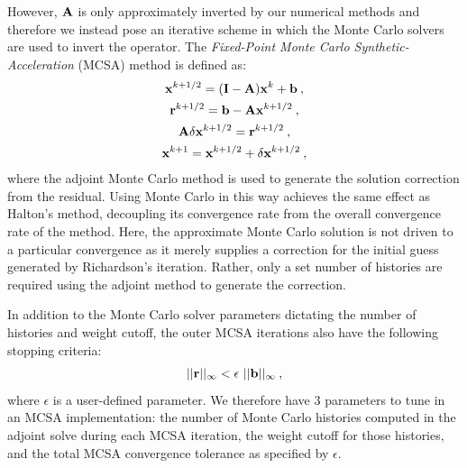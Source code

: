 However, $\mathbf{A}$ is only approximately inverted by our numerical
methods and therefore we instead pose an iterative scheme in which the
Monte Carlo solvers are used to invert the operator. The
\textit{Fixed-Point Monte Carlo Synthetic-Acceleration} (MCSA) method
is defined as:
\begin{subequations}
  \begin{gather}
    \mathbf{x}^{k+1/2} = (\mathbf{I} - \mathbf{A})\mathbf{x}^k + \mathbf{b}\:,\\
    \mathbf{r}^{k+1/2} = \mathbf{b} - \mathbf{A}\mathbf{x}^{k+1/2}\:,\\
    \mathbf{A}\delta\mathbf{x}^{k+1/2} = \mathbf{r}^{k+1/2}\:,\\
    \mathbf{x}^{k+1} = \mathbf{x}^{k+1/2} + \delta \mathbf{x}^{k+1/2}\:,
  \end{gather}
  \label{eq:mcsa}
\end{subequations}
where the adjoint Monte Carlo method is used to generate the solution
correction from the residual. Using Monte Carlo in this way achieves
the same effect as Halton's method, decoupling its convergence rate
from the overall convergence rate of the method. Here, the approximate
Monte Carlo solution is not driven to a particular convergence as it
merely supplies a correction for the initial guess generated by
Richardson's iteration. Rather, only a set number of histories are
required using the adjoint method to generate the correction.

In addition to the Monte Carlo solver parameters dictating the number
of histories and weight cutoff, the outer MCSA iterations also have
the following stopping criteria:
\begin{equation}
  ||\ve{r}||_\infty < \epsilon \ ||\ve{b}||_\infty\:,
  \label{eq:mcsa_stopping_criteria}
\end{equation}
where $\epsilon$ is a user-defined parameter. We therefore have 3
parameters to tune in an MCSA implementation: the number of Monte
Carlo histories computed in the adjoint solve during each MCSA
iteration, the weight cutoff for those histories, and the total MCSA
convergence tolerance as specified by $\epsilon$.

